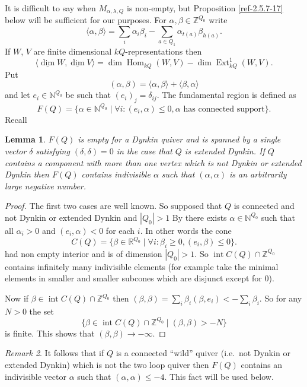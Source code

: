 \documentclass{amsart}
\numberwithin{equation}{section}
\let\blb\mathbb
\newtheorem{lemmas}{Lemma}[subsection]
\theoremstyle{definition}
\theoremstyle{remark}
\newtheorem{remarks}[lemmas]{Remark}
\begin{document}
It is difficult to say when $M_{\alpha,\lambda,Q}$ is non-empty, but Proposition \ref{ref-2.5.7-17} below will be
sufficient for our purposes. For $\alpha,\beta\in {{\blb Z}}^{Q_0}$ write
\[
\langle \alpha,\beta\rangle=\sum_i\alpha_i\beta_i-\sum_{a\in Q_1} \alpha_{t(a)}\beta_{h(a)}.
\]
If $W$, $V$ are finite dimensional $kQ$-representations then
\[
 \langle {\operatorname{\underline{\dim}}} W, {\operatorname{\underline{\dim}}} V \rangle=\dim {\operatorname {Hom}}_{kQ}(W,V)-\dim {\operatorname {Ext}}_{kQ}^1(W,V).
\]
Put 
\[
(\alpha,\beta)=\langle \alpha,\beta\rangle+\langle \beta,\alpha\rangle
\]
and let $e_i\in {{\blb N}}^{Q_0}$ be such that $(e_i)_j=\delta_{ij}$.  The fundamental region \cite{Kac1} is defined as 
\[
F(Q)=\{\alpha\in {{\blb N}}^{Q_0}\mid \forall i: (e_i,\alpha)\le 0, \text{$\alpha$ has connected support}\}.
\]
Recall
\begin{lemmas}
$F(Q)$ is empty for a Dynkin quiver and is spanned by a single vector
$\delta$ satisfying $(\delta,\delta)=0$ in the case that $Q$ is
extended Dynkin. If $Q$ contains a component with more than one vertex which is not Dynkin
or extended Dynkin then $F(Q)$ contains indivisible
$\alpha$ such that $(\alpha,\alpha)$ is an arbitrarily large negative
number. 
\end{lemmas}
\begin{proof}
The first two cases are well known. So supposed that $Q$ is connected and not Dynkin or extended Dynkin and $|Q_0|>1$
By
\cite[Lemma 1.2]{Kac1}  there exists $\alpha\in {{\blb N}}^{Q_0}$ such that
all $\alpha_i>0$ and  $(e_i,\alpha)<0$ for each $i$. In other
words the cone
\[
C(Q)=\{\beta\in {{\blb R}}^{Q_0}\mid \forall i: \beta_i\ge 0, (e_i,\beta)\le 0\}.
\]
had non empty interior and is of dimension
$|Q_0|>1$. So $\operatorname{int} C(Q)\cap {{\blb Z}}^{Q_0}$
 contains infinitely many indivisible elements (for example take the minimal elements in smaller and smaller subcones which are disjunct except for 0). 

Now if $\beta\in \operatorname{int} C(Q)\cap {{\blb Z}}^{Q_0}$ then $(\beta,\beta)=\sum_i\beta_i (\beta,e_i)<-\sum_i\beta_i$. So for any $N>0$ the set
\[
\{\beta\in \operatorname{int} C(Q)\cap {{\blb Z}}^{Q_0}\mid (\beta,\beta)>-N\}
\]
is finite. This shows that $(\beta,\beta){\rightarrow} -\infty$.
\end{proof}
\begin{remarks} It follows that if $Q$ is a connected ``wild'' quiver
  (i.e.\ not Dynkin or extended Dynkin) which is not the two loop quiver
  then $F(Q)$ contains an indivisible vector $\alpha$ such that
  $(\alpha,\alpha)\le -4$. This fact will be used below.
\end{remarks}
\end{document}
